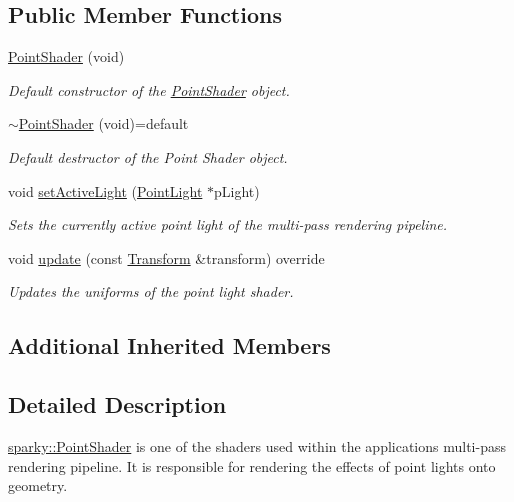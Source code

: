 \subsection*{Public Member Functions}
\begin{DoxyCompactItemize}
\item 
\hyperlink{classsparky_1_1_point_shader_a76657c1a0653f9521bf25fcece5c004f}{Point\+Shader} (void)
\begin{DoxyCompactList}\small\item\em Default constructor of the \hyperlink{classsparky_1_1_point_shader}{Point\+Shader} object. \end{DoxyCompactList}\item 
\hyperlink{classsparky_1_1_point_shader_affc386eeb79d33dceb4beee4a25c0004}{$\sim$\+Point\+Shader} (void)=default\hypertarget{classsparky_1_1_point_shader_affc386eeb79d33dceb4beee4a25c0004}{}\label{classsparky_1_1_point_shader_affc386eeb79d33dceb4beee4a25c0004}

\begin{DoxyCompactList}\small\item\em Default destructor of the Point Shader object. \end{DoxyCompactList}\item 
void \hyperlink{classsparky_1_1_point_shader_a2060a2423cf2aed74c6944d777557ba9}{set\+Active\+Light} (\hyperlink{classsparky_1_1_point_light}{Point\+Light} $\ast$p\+Light)
\begin{DoxyCompactList}\small\item\em Sets the currently active point light of the multi-\/pass rendering pipeline. \end{DoxyCompactList}\item 
void \hyperlink{classsparky_1_1_point_shader_a96b31364d736885500c7af9615ed11bd}{update} (const \hyperlink{classsparky_1_1_transform}{Transform} \&transform) override
\begin{DoxyCompactList}\small\item\em Updates the uniforms of the point light shader. \end{DoxyCompactList}\end{DoxyCompactItemize}
\subsection*{Additional Inherited Members}


\subsection{Detailed Description}
\hyperlink{classsparky_1_1_point_shader}{sparky\+::\+Point\+Shader} is one of the shaders used within the applications multi-\/pass rendering pipeline. It is responsible for rendering the effects of point lights onto geometry.

